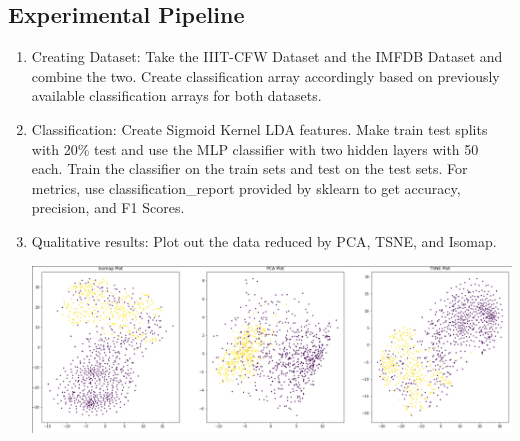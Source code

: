 \documentclass[10pt]{article}
\begin{document}
\subsection{Experimental Pipeline}
\begin{enumerate}
    \item Creating Dataset: Take the IIIT-CFW Dataset and the IMFDB Dataset and combine the two. Create classification array accordingly based on previously available classification arrays for both datasets.

    \item Classification: Create Sigmoid Kernel LDA features. Make train test splits with 20\% test and use the MLP classifier with two hidden layers with 50 each. Train the classifier on the train sets and test on the test sets. For metrics, use classification\_report provided by sklearn to get accuracy, precision, and F1 Scores. 

    \item Qualitative results: Plot out the data reduced by PCA, TSNE, and Isomap.

        \includegraphics[scale=0.25]{./4_res.png}
\end{enumerate}


% 
% 
\end{document}
